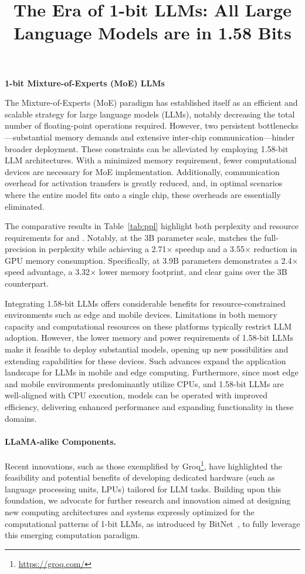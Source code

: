 \title{The Era of 1-bit LLMs: All Large Language Models are in 1.58 Bits}
\textbf{1-bit Mixture-of-Experts (MoE) LLMs}

The Mixture-of-Experts (MoE) paradigm has established itself as an efficient and scalable strategy for large language models (LLMs), notably decreasing the total number of floating-point operations required. However, two persistent bottlenecks—substantial memory demands and extensive inter-chip communication—hinder broader deployment. These constraints can be alleviated by employing 1.58-bit LLM architectures. With a minimized memory requirement, fewer computational devices are necessary for MoE implementation. Additionally, communication overhead for activation transfers is greatly reduced, and, in optimal scenarios where the entire model fits onto a single chip, these overheads are essentially eliminated.

The comparative results in Table~\ref{tab:ppl} highlight both perplexity and resource requirements for  and . Notably, at the 3B parameter scale,  matches the full-precision  in perplexity while achieving a 2.71$\times$ speedup and a 3.55$\times$ reduction in GPU memory consumption. Specifically,  at 3.9B parameters demonstrates a 2.4$\times$ speed advantage, a 3.32$\times$ lower memory footprint, and clear gains over the  3B counterpart.

Integrating 1.58-bit LLMs offers considerable benefits for resource-constrained environments such as edge and mobile devices. Limitations in both memory capacity and computational resources on these platforms typically restrict LLM adoption. However, the lower memory and power requirements of 1.58-bit LLMs make it feasible to deploy substantial models, opening up new possibilities and extending capabilities for these devices. Such advances expand the application landscape for LLMs in mobile and edge computing. Furthermore, since most edge and mobile environments predominantly utilize CPUs, and 1.58-bit LLMs are well-aligned with CPU execution,  models can be operated with improved efficiency, delivering enhanced performance and expanding functionality in these domains.

\paragraph{LLaMA-alike Components.}

Recent innovations, such as those exemplified by Groq\footnote{\url{https://groq.com/}}, have highlighted the feasibility and potential benefits of developing dedicated hardware (such as language processing units, LPUs) tailored for LLM tasks. Building upon this foundation, we advocate for further research and innovation aimed at designing new computing architectures and systems expressly optimized for the computational patterns of 1-bit LLMs, as introduced by BitNet~\cite{bitnet}, to fully leverage this emerging computation paradigm.

